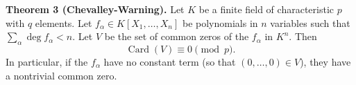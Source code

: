 \textbf{Theorem 3 (Chevalley-Warning).} Let $K$ be a finite field of characteristic $p$ with $q$ elements. Let $f_\alpha \in K[X_1, \ldots, X_n]$ be polynomials in $n$ variables such that $\sum_\alpha \deg f_\alpha < n$. Let $V$ be the set of common zeros of the $f_\alpha$ in $K^n$. Then
$$\operatorname{Card}(V) \equiv 0 \pmod{p}.$$
In particular, if the $f_\alpha$ have no constant term (so that $(0,\ldots,0) \in V$), they have a nontrivial common zero.
